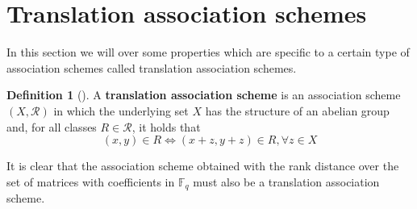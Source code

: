 \documentclass[a4paper,12pt]{article}
\theoremstyle{plain}
\theoremstyle{definition}
\newtheorem{definition}[theorem]{Definition}
\theoremstyle{remark}
\begin{document}
\section{Translation association schemes}
In this section we will over some properties which are specific to a certain type
of association schemes called translation association schemes.

\begin{definition}[{\parencite[Section 2.10]{brouwer_distance-regular_1989}}]
    A \textbf{translation association scheme} is an association scheme
    $ (X, \mathcal{R}) $ in which the underlying set $ X $ has the structure of
    an abelian group and, for all classes $ R \in \mathcal{R} $, it holds that
    \[ (x,y) \in R \iff (x+z,y+z) \in R, \forall z \in X \]
\end{definition}

It is clear that the association scheme obtained with the rank distance over the
set of matrices with coefficients in $\mathbb{F}_{q}$ must also be a
translation association scheme.
\end{document}
